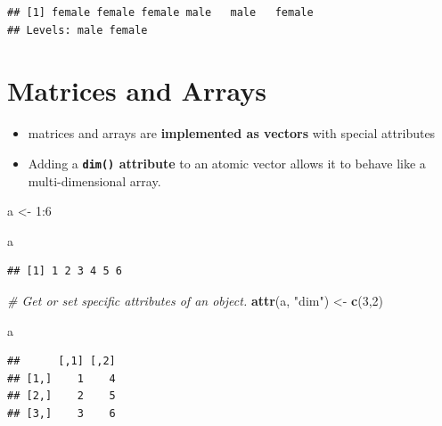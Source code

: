 \documentclass[]{book}
\newenvironment{Shaded}{\begin{snugshade}}{\end{snugshade}}
\newcommand{\KeywordTok}[1]{\textcolor[rgb]{0.13,0.29,0.53}{\textbf{{#1}}}}
\newcommand{\DecValTok}[1]{\textcolor[rgb]{0.00,0.00,0.81}{{#1}}}
\newcommand{\StringTok}[1]{\textcolor[rgb]{0.31,0.60,0.02}{{#1}}}
\newcommand{\CommentTok}[1]{\textcolor[rgb]{0.56,0.35,0.01}{\textit{{#1}}}}
\newcommand{\NormalTok}[1]{{#1}}
\providecommand{\tightlist}{%
  \setlength{\itemsep}{0pt}\setlength{\parskip}{0pt}}
\begin{document}
\begin{verbatim}
## [1] female female female male   male   female
## Levels: male female
\end{verbatim}

\section{Matrices and Arrays}\label{matrices-and-arrays}

\begin{itemize}
\tightlist
\item
  matrices and arrays are \textbf{implemented as vectors} with special
  attributes
\item
  Adding a \textbf{\texttt{dim()} attribute} to an atomic vector allows
  it to behave like a multi-dimensional array.
\end{itemize}

\begin{Shaded}
\begin{Highlighting}[]
\NormalTok{a <-}\StringTok{ }\DecValTok{1}\NormalTok{:}\DecValTok{6}
\end{Highlighting}
\end{Shaded}

\begin{Shaded}
\begin{Highlighting}[]
\NormalTok{a}
\end{Highlighting}
\end{Shaded}

\begin{verbatim}
## [1] 1 2 3 4 5 6
\end{verbatim}

\begin{Shaded}
\begin{Highlighting}[]
\CommentTok{# Get or set specific attributes of an object.}
\KeywordTok{attr}\NormalTok{(a, }\StringTok{"dim"}\NormalTok{) <-}\StringTok{ }\KeywordTok{c}\NormalTok{(}\DecValTok{3}\NormalTok{,}\DecValTok{2}\NormalTok{)}
\end{Highlighting}
\end{Shaded}

\begin{Shaded}
\begin{Highlighting}[]
\NormalTok{a}
\end{Highlighting}
\end{Shaded}

\begin{verbatim}
##      [,1] [,2]
## [1,]    1    4
## [2,]    2    5
## [3,]    3    6
\end{verbatim}
\end{document}
